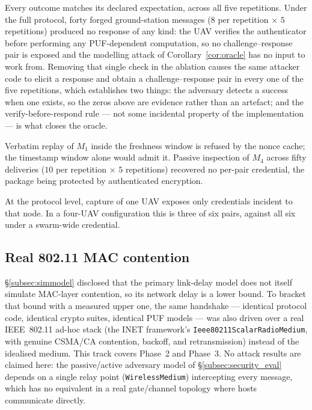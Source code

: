 \documentclass[11pt,a4paper]{article}
\begin{document}
Every outcome matches its declared expectation, across all five repetitions.
Under the full protocol, forty forged ground-station messages ($8$ per
repetition $\times$ $5$ repetitions) produced no response of any kind: the UAV
verifies the authenticator before performing any PUF-dependent computation, so no
challenge--response pair is exposed and the modelling attack of
Corollary~\ref{cor:oracle} has no input to work from. Removing that single check in
the ablation causes the same attacker code to elicit a response and obtain a
challenge--response pair in every one of the five repetitions, which establishes
two things: the adversary detects a success when one exists, so the zeros above
are evidence rather than an artefact; and the verify-before-respond rule --- not
some incidental property of the implementation --- is what closes the oracle.

Verbatim replay of $M_1$ inside the freshness window is refused by the nonce cache;
the timestamp window alone would admit it. Passive inspection of $M_4$ across
fifty deliveries ($10$ per repetition $\times$ $5$ repetitions) recovered no
per-pair credential, the package being protected by authenticated encryption.

At the protocol level, capture of one UAV exposes only credentials incident to that
node. In a four-UAV configuration this is three of six pairs, against all six under
a swarm-wide credential.

\subsection{Real 802.11 MAC contention}
\label{subsec:inet}

\S\ref{subsec:simmodel} disclosed that the primary link-delay model does not
itself simulate MAC-layer contention, so its network delay is a lower bound. To
bracket that bound with a measured upper one, the same handshake --- identical
protocol code, identical crypto suites, identical PUF models --- was also driven
over a real IEEE~802.11 ad-hoc stack (the INET framework's
\texttt{Ieee80211ScalarRadioMedium}, with genuine CSMA/CA contention, backoff,
and retransmission) instead of the idealised medium. This track covers Phase~2
and Phase~3. No attack results are claimed here: the passive/active adversary
model of \S\ref{subsec:security_eval} depends on a single relay point
(\texttt{WirelessMedium}) intercepting every message, which has no equivalent in
a real gate/channel topology where hosts communicate directly.
\end{document}
